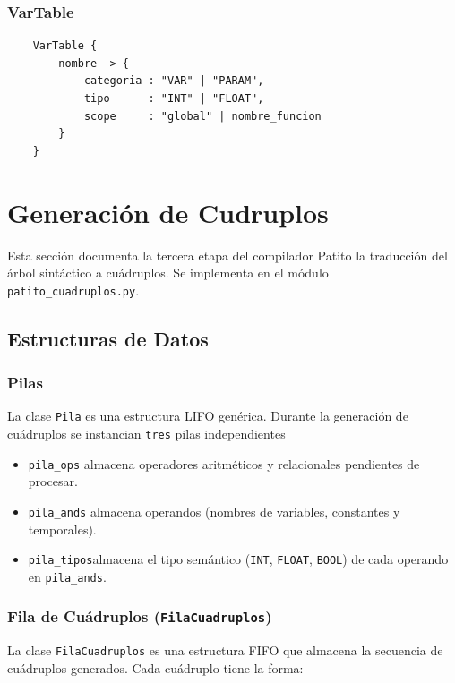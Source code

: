 \documentclass[12pt, letterpaper]{article}
\theoremstyle{definition}
\begin{document}
\subsubsection{VarTable}
\begin{verbatim}
    VarTable {
        nombre -> {
            categoria : "VAR" | "PARAM",
            tipo      : "INT" | "FLOAT",
            scope     : "global" | nombre_funcion
        }
    }
\end{verbatim}




\section{Generación de Cudruplos}

Esta sección documenta la tercera etapa del compilador Patito la traducción del árbol sintáctico a cuádruplos. Se implementa en el módulo \texttt{patito\_cuadruplos.py}.

\subsection{Estructuras de Datos}

\subsubsection{Pilas}

La clase \texttt{Pila} es una estructura LIFO genérica.  Durante la generación de cuádruplos se instancian \texttt{tres} pilas independientes

\begin{itemize}
    \item \texttt{pila\_ops}   almacena operadores aritméticos y relacionales pendientes de procesar.
    \item \texttt{pila\_ands}  almacena operandos (nombres de variables, constantes y temporales).
    \item \texttt{pila\_tipos}almacena el tipo semántico (\texttt{INT}, \texttt{FLOAT}, \texttt{BOOL}) de cada operando en \texttt{pila\_ands}.
\end{itemize}


\subsubsection{Fila de Cuádruplos (\texttt{FilaCuadruplos})}

La clase \texttt{FilaCuadruplos} es una estructura FIFO que almacena la secuencia de cuádruplos generados.  Cada cuádruplo tiene la forma:
\end{document}
